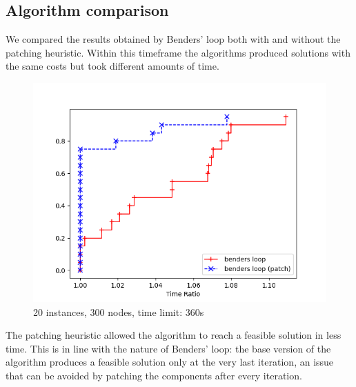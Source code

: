\subsection{Algorithm comparison}

We compared the results obtained by Benders' loop both with and without the patching heuristic. Within this timeframe the algorithms produced solutions with the same costs but took different amounts of time.

\FloatBarrier
\begin{figure}[h]
    \centering
    \includegraphics*[width=.6\textwidth]{../plots/perfprof_benders_times.png}
    \caption*{20 instances, 300 nodes, time limit: 360s}
\end{figure}
\FloatBarrier

The patching heuristic allowed the algorithm to reach a feasible solution in less time. This is in line with the nature of Benders' loop: the base version of the algorithm produces a feasible solution only at the very last iteration, an issue that can be avoided by patching the components after every iteration.